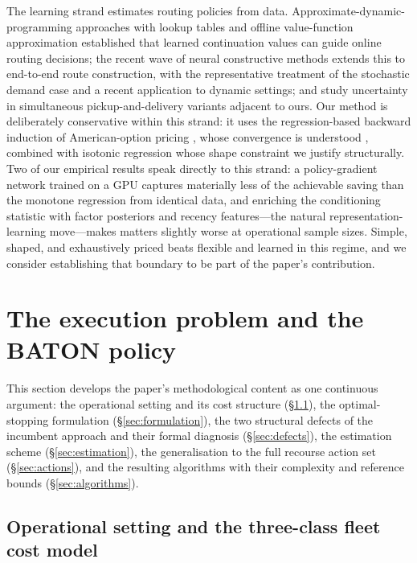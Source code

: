 \documentclass[preprint,authoryear,12pt]{elsarticle}
\theoremstyle{definition}
\theoremstyle{remark}
\begin{document}
The learning strand estimates routing policies from data.
Approximate-dynamic-programming approaches with lookup tables
\citep{novoa2009approximate} and offline value-function approximation
\citep{ulmer2019offline} established that learned continuation values
can guide online routing decisions; the recent wave of neural
constructive methods extends this to end-to-end route construction, with
\citet{iklassov2024rl} the representative treatment of the stochastic
demand case and \citet{kadyrov2025deep} a recent application to dynamic
settings; \citet{hu2025vehicle} and \citet{wang2026drone} study
uncertainty in simultaneous pickup-and-delivery variants adjacent to
ours. Our method is deliberately conservative within this strand: it
uses the regression-based backward induction of American-option pricing
\citep{longstaff2001valuing,tsitsiklis2001regression}, whose convergence
is understood \citep{clement2002analysis}, combined with isotonic
regression \citep{barlow1972statistical,robbins1955empirical} whose
shape constraint we justify structurally. Two of our empirical results
speak directly to this strand: a policy-gradient network trained on a
GPU captures materially less of the achievable saving than the monotone
regression from identical data, and enriching the conditioning statistic
with factor posteriors and recency features---the natural
representation-learning move---makes matters slightly worse at
operational sample sizes. Simple, shaped, and exhaustively priced beats
flexible and learned in this regime, and we consider establishing that
boundary to be part of the paper's contribution.


\section{The execution problem and the BATON policy}
\label{sec:method}

This section develops the paper's methodological content as one
continuous argument: the operational setting and its cost structure
(\S\ref{sec:setting}), the optimal-stopping formulation
(\S\ref{sec:formulation}), the two structural defects of the incumbent
approach and their formal diagnosis (\S\ref{sec:defects}), the
estimation scheme (\S\ref{sec:estimation}), the generalisation to the
full recourse action set (\S\ref{sec:actions}), and the resulting
algorithms with their complexity and reference bounds
(\S\ref{sec:algorithms}).

\subsection{Operational setting and the three-class fleet cost model}
\label{sec:setting}
\end{document}
